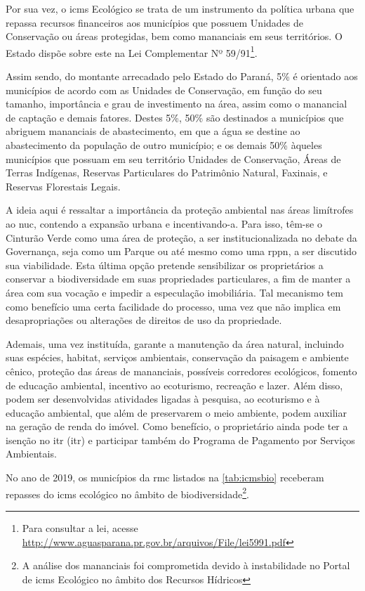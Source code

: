 	Por sua vez, o \gls{icms} Ecológico se trata de um instrumento da política urbana que repassa recursos financeiros aos municípios que possuem Unidades de Conservação ou áreas protegidas, bem como mananciais em seus territórios. O Estado dispõe sobre este na Lei Complementar Nº 59/91\footnote{Para consultar a lei, acesse \url{http://www.aguasparana.pr.gov.br/arquivos/File/lei5991.pdf}}.
	
	Assim sendo, do montante arrecadado pelo Estado do Paraná, 5\% é orientado aos municípios de acordo com as Unidades de Conservação, em função do seu tamanho, importância e grau de investimento na área, assim como o manancial de captação e demais fatores. Destes 5\%, 50\% são destinados a municípios que abriguem mananciais de abastecimento, em que a água se destine ao abastecimento da população de outro município; e os demais 50\% àqueles municípios que possuam em seu território Unidades de Conservação, Áreas de Terras Indígenas, Reservas Particulares do Patrimônio Natural, Faxinais, e Reservas Florestais Legais.
	
	A ideia aqui é ressaltar a importância da proteção ambiental nas áreas limítrofes ao \gls{nuc}, contendo a expansão urbana e incentivando-a. Para isso, têm-se o Cinturão Verde como uma área de proteção, a ser institucionalizada no debate da Governança, seja como um Parque ou até mesmo como uma \gls{rppn}, a ser discutido sua viabilidade. Esta última opção pretende sensibilizar os proprietários a conservar a biodiversidade em suas propriedades particulares, a fim de manter a área com sua vocação e impedir a especulação imobiliária. Tal mecanismo tem como benefício uma certa facilidade do processo, uma vez que não implica em desapropriações ou alterações de direitos de uso da propriedade.
	
	Ademais, uma vez instituída, garante a manutenção da área natural, incluindo suas espécies, habitat, serviços ambientais, conservação da paisagem e ambiente cênico, proteção das áreas de mananciais, possíveis corredores ecológicos, fomento de educação ambiental, incentivo ao ecoturismo, recreação e lazer. Além disso, podem ser desenvolvidas atividades ligadas à pesquisa, ao ecoturismo e à educação ambiental, que além de preservarem o meio ambiente, podem auxiliar na geração de renda do imóvel. Como benefício, o proprietário ainda pode ter a isenção no \glsdesc{itr} (\gls{itr}) e participar também do Programa de Pagamento por Serviços Ambientais.
	
	No ano de 2019, os municípios da \glsdesc{rmc} listados na \autoref{tab:icmsbio} receberam repasses do \gls{icms} ecológico no âmbito de biodiversidade\footnote{A análise dos mananciais foi comprometida devido à instabilidade no Portal de \gls{icms} Ecológico no âmbito dos Recursos Hídricos}.
	

